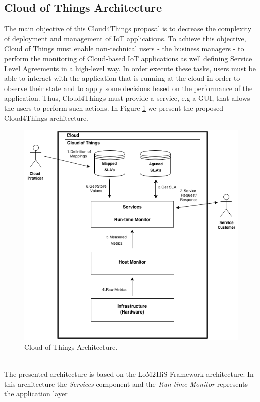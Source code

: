 \subsection{Cloud of Things Architecture}
\label{sub:cloud_of_things_architecture}
The main objective of this Cloud4Things proposal is  to decrease the complexity of deployment and management
of IoT applications. To achieve this objective, Cloud of Things must enable non-technical users - the business
managers - to perform the monitoring of Cloud-based IoT applications as well defining Service Level Agreements
in a high-level way. In order execute these tasks, users must be able to interact with the application that
is running at the cloud in order to observe their state and to apply some decisions based on the performance
of the application. Thus, Cloud4Things must provide a service, e.g a GUI, that allows the users to perform
such actions. In Figure \ref{fig:cloud_of_things_architecture} we present the proposed Cloud4Things architecture.
\vspace{1in}
\begin{figure}[h!]
  \centering
  \includegraphics[width=.8\textwidth]{./images/cloud-of-things-architecture}
  \caption{Cloud of Things Architecture.}
  \label{fig:cloud_of_things_architecture}
\end{figure}\\
The presented architecture is based on the LoM2HiS Framework \cite{emeakaroha2010low} architecture. In this
architecture the \textit{Services} component and the \textit{Run-time Monitor} represents the application layer
